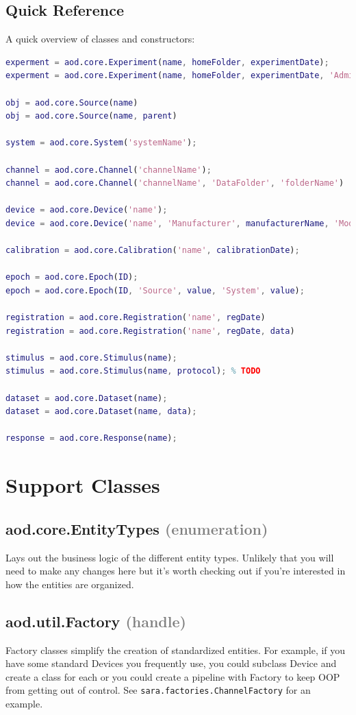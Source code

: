 \documentclass[10pt]{exam}
\newcommand\myparent[1]{\textcolor{gray}{(#1)}}
\newcommand\aodclass[1]{\textcolor{codeblue}{\texttt{#1}}}
\begin{document}
	\subsection{Quick Reference}
		\noindent A quick overview of classes and constructors:
		\begin{lstlisting}[language=matlab]
experment = aod.core.Experiment(name, homeFolder, experimentDate);
experment = aod.core.Experiment(name, homeFolder, experimentDate, 'Administrator', value, 'System', value);

obj = aod.core.Source(name)
obj = aod.core.Source(name, parent)

system = aod.core.System('systemName');

channel = aod.core.Channel('channelName');
channel = aod.core.Channel('channelName', 'DataFolder', 'folderName')

device = aod.core.Device('name');
device = aod.core.Device('name', 'Manufacturer', manufacturerName, 'Model', modelName);

calibration = aod.core.Calibration('name', calibrationDate);

epoch = aod.core.Epoch(ID);
epoch = aod.core.Epoch(ID, 'Source', value, 'System', value);

registration = aod.core.Registration('name', regDate)
registration = aod.core.Registration('name', regDate, data)

stimulus = aod.core.Stimulus(name);
stimulus = aod.core.Stimulus(name, protocol); % TODO

dataset = aod.core.Dataset(name);
dataset = aod.core.Dataset(name, data);

response = aod.core.Response(name);
		\end{lstlisting}
	
\section{Support Classes}
	\subsection{aod.core.EntityTypes \myparent{enumeration}}
		\noindent Lays out the business logic of the different entity types. Unlikely that you will need to make any changes here but it's worth checking out if you're interested in how the entities are organized. 
		
	\subsection{aod.util.Factory \textcolor{gray}{(handle)}}
		\noindent Factory classes simplify the creation of standardized entities. For example, if you have some standard Devices you frequently use, you could subclass Device and create a class for each or you could create a pipeline with Factory to keep OOP from getting out of control. See \aodclass{sara.factories.ChannelFactory} for an example. 
		
\end{document}
